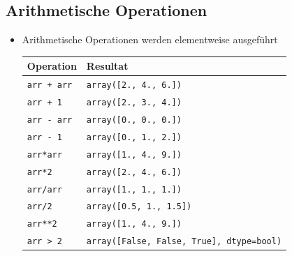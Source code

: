 \subsection{Arithmetische Operationen}
\begin{itemize}
	\item Arithmetische Operationen werden elementweise ausgeführt\\
	
	\begin{tabular}{|l|l|}
		\hline
		\textbf{Operation} &\textbf{Resultat}\\
		\hline
		\texttt{arr + arr} &\texttt{array([2., 4., 6.])}\\
		\texttt{arr + 1} &\texttt{array([2., 3., 4.])}\\
		\texttt{arr - arr} &\texttt{array([0., 0., 0.])}\\
		\texttt{arr - 1} &\texttt{array([0., 1., 2.])}\\
		\texttt{arr*arr} &\texttt{array([1., 4., 9.])}\\
		\texttt{arr*2} &\texttt{array([2., 4., 6.])}\\
		\texttt{arr/arr} &\texttt{array([1., 1., 1.])}\\
		\texttt{arr/2} &\texttt{array([0.5, 1., 1.5])}\\
		\texttt{arr**2} &\texttt{array([1., 4., 9.])}\\
		\texttt{arr > 2} &\texttt{array([False, False, True], dtype=bool)}\\
		\hline
	\end{tabular}
\end{itemize}

\vfill\null
\pagebreak
